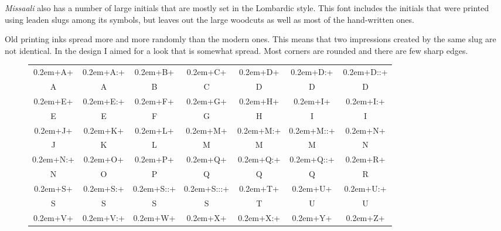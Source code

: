 \documentclass[a4paper, 12pt]{article}
\newcommand{\initsample}[1]{{\initsamplefont #1}}
\newcommand{\initsamplefont}{\fontsize{36}{36}\fontspec{Missaali}\spaceskip0.2em}
\begin{document}
\emph{Missaali} also has a number of large initials that are mostly set
in the Lombardic style. This font includes the initials that were
printed using leaden slugs among its symbols, but leaves out the large
woodcuts as well as most of the hand-written ones. 

Old printing inks spread more and more randomly than the modern ones.
This means that two impressions created by the same slug are not identical.
In the design I aimed for a look that is somewhat spread. Most corners
are rounded and there are few sharp edges.

\begin{figure}
  \centering
  {\renewcommand{\arraystretch}{1.5}
  \begin{tabular}{ccccccc}
\initsample{+A+} & 
\initsample{+A:+} & 
\initsample{+B+} & 
\initsample{+C+} & 
\initsample{+D+} & 
\initsample{+D:+} & 
\initsample{+D::+} \\

A & A & B & C & D & D & D \\


\initsample{+E+} & 
\initsample{+E:+} & 
\initsample{+F+} & 
\initsample{+G+} & 
\initsample{+H+} & 
\initsample{+I+} & 
\initsample{+I:+} \\

E & E & F & G & H & I & I \\


\initsample{+J+} & 
\initsample{+K+} & 
\initsample{+L+} & 
\initsample{+M+} & 
\initsample{+M:+} & 
\initsample{+M::+} & 
\initsample{+N+} \\

J & K & L & M & M & M & N \\

\initsample{+N:+} & 
\initsample{+O+} & 
\initsample{+P+} & 
\initsample{+Q+} & 
\initsample{+Q:+} & 
\initsample{+Q::+} & 
\initsample{+R+} \\


N & O & P & Q & Q & Q & R \\

\initsample{+S+} &
\initsample{+S:+} & 
\initsample{+S::+} & 
\initsample{+S:::+} & 
\initsample{+T+} & 
\initsample{+U+} & 
\initsample{+U:+}  \\

S & S & S & S & T & U & U  \\


\initsample{+V+} &
\initsample{+V:+} & 
\initsample{+W+} & 
\initsample{+X+} & 
\initsample{+X:+} & 
\initsample{+Y+} & 
\initsample{+Z+} \\


\end{tabular}}
\end{figure}
\end{document}
